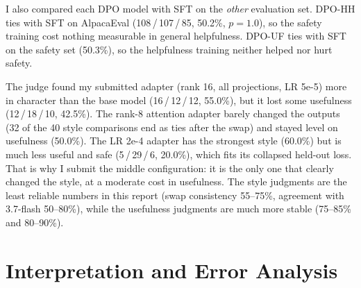 \documentclass[10pt,a4paper]{article}
\begin{document}
\begin{table}[h]
\centering

\caption{Cross-set check (single order, not part of the required comparison).}
\end{table}

I also compared each DPO model with SFT on the \emph{other} evaluation set. DPO-HH ties with SFT on AlpacaEval (108\,/\,107\,/\,85, 50.2\%,
$p=1.0$), so the safety training cost nothing measurable in general helpfulness. DPO-UF ties with SFT on the safety set (50.3\%), so the
helpfulness training neither helped nor hurt safety.

\begin{table}[h]
\centering

\caption{LoRA persona result (SmolLM2-360M-Instruct vs.\ the base instruct model, 40 prompts). Style and usefulness are judged separately (a
persona-faithfulness rubric and a tone-blind usefulness/safety rubric), both order-debiased. Base model: 136 mean words.}
\label{tab:persona}
\end{table}

The judge found my submitted adapter (rank 16, all projections, LR 5e-5) more in character than the base model (16\,/\,12\,/\,12, 55.0\%), but it
lost some usefulness (12\,/\,18\,/\,10, 42.5\%). The rank-8 attention adapter barely changed the outputs (32 of the 40 style comparisons end as
ties after the swap) and stayed level on usefulness (50.0\%). The LR 2e-4 adapter has the strongest style (60.0\%) but is much less useful and
safe (5\,/\,29\,/\,6, 20.0\%), which fits its collapsed held-out loss. That is why I submit the middle configuration: it is the only one that clearly
changed the style, at a moderate cost in usefulness. The style judgments are the least reliable numbers in this report (swap consistency
55--75\%, agreement with 3.7-flash 50--80\%), while the usefulness judgments are much more stable (75--85\% and 80--90\%).

\section{Interpretation and Error Analysis}
\end{document}
